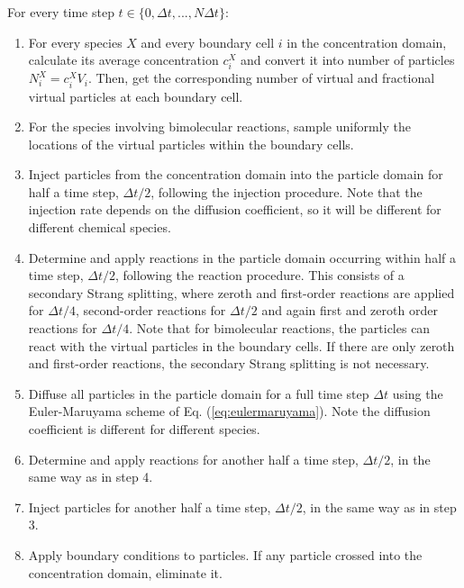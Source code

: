 \documentclass[10pt,twocolumn]{revtex4-1}
\begin{document}
	For every time step $t\in\{0, \Delta t,...,N\Delta t\}$:
	\begin{enumerate}
		\item For every species $X$ and every boundary cell $i$ in the concentration domain, calculate its average concentration $c_i^X$ and convert it into number of particles $N_i^X=c_i^X V_i$. Then, get the corresponding number of virtual and fractional virtual particles at each boundary cell. 
		
		\item For the species involving bimolecular reactions, sample uniformly the locations of the virtual particles within the boundary cells.
		
		\item Inject particles from the concentration domain into the particle domain for half a time step, $\Delta t /2$, following the injection procedure. Note that the injection rate depends on the diffusion coefficient, so it will be different for different chemical species.
		
		\item Determine and apply reactions in the particle domain occurring within half a time step, $\Delta t/2$, following the reaction procedure. This consists of a secondary Strang splitting, where zeroth and first-order reactions are applied for $\Delta t/4$, second-order reactions for $\Delta t/2$ and again first and zeroth order reactions for $\Delta t/4$. Note that for bimolecular reactions, the particles can react with the virtual particles in the boundary cells. If there are only zeroth and first-order reactions, the secondary Strang splitting is not necessary.
		
		\item Diffuse all particles in the particle domain for a full time step $\Delta t$ using the Euler-Maruyama scheme of Eq. (\ref{eq:eulermaruyama}). Note the diffusion coefficient is different for different species.
		
		\item Determine and apply reactions for another half a time step, $\Delta t /2$, in the same way as in step 4.
		
		\item Inject particles for another half a time step, $\Delta t /2$, in the same way as in step 3.
		
		\item Apply boundary conditions to particles. If any particle crossed into the concentration domain, eliminate it.
	\end{enumerate}
	
\end{document}

